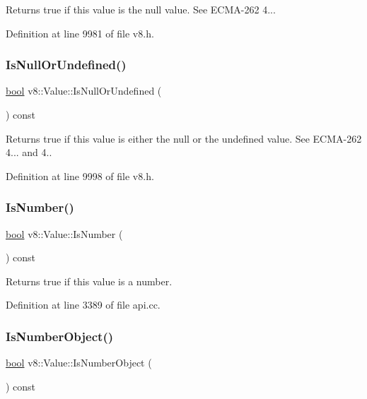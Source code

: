 Returns true if this value is the null value. See E\+C\+M\+A-\/262 4... 

Definition at line 9981 of file v8.\+h.

\mbox{\label{classv8_1_1Value_a47bb1e442bf9741e9e29468659e8cdba}} 
\subsubsection{\texorpdfstring{Is\+Null\+Or\+Undefined()}{IsNullOrUndefined()}}
{\footnotesize\ttfamily \mbox{\hyperlink{classbool}{bool}} v8\+::\+Value\+::\+Is\+Null\+Or\+Undefined (\begin{DoxyParamCaption}{ }\end{DoxyParamCaption}) const}

Returns true if this value is either the null or the undefined value. See E\+C\+M\+A-\/262 4... and 4.. 

Definition at line 9998 of file v8.\+h.

\mbox{\label{classv8_1_1Value_a6ef42a28c0bc70022acb7e308bda4e19}} 
\subsubsection{\texorpdfstring{Is\+Number()}{IsNumber()}}
{\footnotesize\ttfamily \mbox{\hyperlink{classbool}{bool}} v8\+::\+Value\+::\+Is\+Number (\begin{DoxyParamCaption}{ }\end{DoxyParamCaption}) const}

Returns true if this value is a number. 

Definition at line 3389 of file api.\+cc.

\mbox{\label{classv8_1_1Value_a497018ef8c5ed946e1c0c30554bad3f8}} 
\subsubsection{\texorpdfstring{Is\+Number\+Object()}{IsNumberObject()}}
{\footnotesize\ttfamily \mbox{\hyperlink{classbool}{bool}} v8\+::\+Value\+::\+Is\+Number\+Object (\begin{DoxyParamCaption}{ }\end{DoxyParamCaption}) const}

